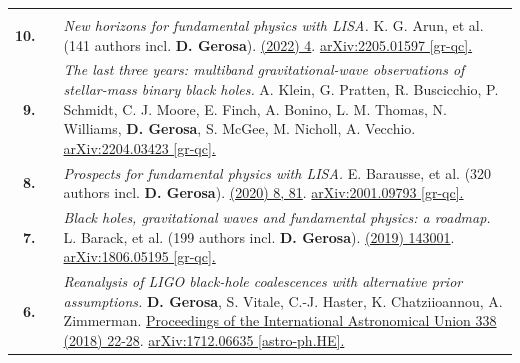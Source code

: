 {\begin{longtable}{rp{0.3cm}p{15.8cm}}
\vspace{0.09cm}\\
%
\textbf{10.} & & \textit{New horizons for fundamental physics with LISA.}
\newline{}
K. G. Arun, et al. (141 authors incl. \textbf{D. Gerosa}).
\newline{}
\href{https://doi.org/10.1007/s41114-022-00036-9}{\lrr 25 (2022) 4}. \href{https://arxiv.org/abs/2205.01597}{arXiv:2205.01597 [gr-qc].}
\vspace{0.09cm}\\
%
\textbf{9.} & & \textit{The last three years: multiband gravitational-wave observations of stellar-mass binary black holes.}
\newline{}
A. Klein, G. Pratten, R. Buscicchio, P. Schmidt, C. J. Moore, E. Finch, A. Bonino, L. M. Thomas, N. Williams, \textbf{D. Gerosa}, S. McGee, M. Nicholl, A. Vecchio.
\newline{}
\href{https://arxiv.org/abs/2204.03423}{arXiv:2204.03423 [gr-qc].}
\vspace{0.09cm}\\
%
\textbf{8.} & & \textit{Prospects for fundamental physics with LISA.}
\newline{}
E. Barausse, et al. (320 authors incl. \textbf{D. Gerosa}).
\newline{}
\href{https://doi.org/10.1007/s10714-020-02691-1}{\grg 52 (2020) 8, 81}. \href{https://arxiv.org/abs/2001.09793}{arXiv:2001.09793 [gr-qc].}
\vspace{0.09cm}\\
%
\textbf{7.} & & \textit{Black holes, gravitational waves and fundamental physics: a roadmap.}
\newline{}
L. Barack, et al. (199 authors incl. \textbf{D. Gerosa}).
\newline{}
\href{https://iopscience.iop.org/article/10.1088/1361-6382/ab0587}{\cqg 36 (2019) 143001}. \href{https://arxiv.org/abs/1806.05195}{arXiv:1806.05195 [gr-qc].}
\vspace{0.09cm}\\
%
\textbf{6.} & & \textit{Reanalysis of LIGO black-hole coalescences with alternative prior assumptions.}
\newline{}
\textbf{D. Gerosa}, S. Vitale, C.-J. Haster, K. Chatziioannou, A. Zimmerman.
\newline{}
\href{https://doi.org/10.1017/S1743921318003587}{Proceedings of the International Astronomical Union 338 (2018) 22-28}. \href{https://arxiv.org/abs/1712.06635}{arXiv:1712.06635 [astro-ph.HE].}
\vspace{0.09cm}\\

\end{longtable}}
